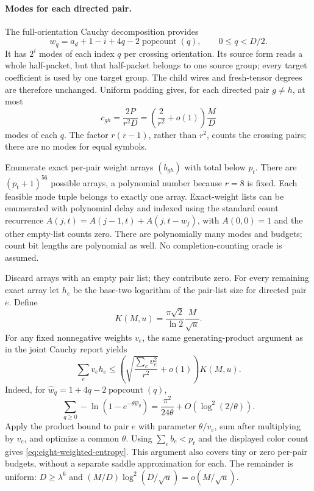 \paragraph{Modes for each directed pair.}
The full-orientation Cauchy decomposition provides
\[
 w_q=a_d+1-i+4q-2\operatorname{popcount}(q),\qquad 0\le q<D/2.
\]
It has $2^i$ modes of each index $q$ per crossing orientation.
Its source form reads a whole half-packet, but that half-packet belongs to
one source group; every target coefficient is used by one target group.
The child wires and fresh-tensor degrees are therefore unchanged.
Uniform padding gives, for each directed pair $g\ne h$, at most
\[
 c_{gh}=\frac{2P}{r^2D}
       =\left(\frac{2}{r^2}+o(1)\right)\frac{M}{D}
\]
modes of each $q$.  The factor $r(r-1)$, rather than $r^2$, counts the
crossing pairs; there are no modes for equal symbols.

Enumerate exact per-pair weight arrays $(b_{gh})$ with total below $p_t$.
There are $(p_t+1)^{56}$ possible arrays, a polynomial number because
$r=8$ is fixed.  Each feasible mode tuple belongs to exactly one array.
Exact-weight lists can be enumerated with polynomial delay and indexed
using the standard count recurrence
$A(j,t)=A(j-1,t)+A(j,t-w_j)$, with $A(0,0)=1$ and the other
empty-list counts zero.  There are polynomially many modes and budgets;
count bit lengths are polynomial as well.  No completion-counting oracle
is assumed.

Discard arrays with an empty pair list; they contribute zero.
For every remaining exact array let $h_e$ be the base-two logarithm of the pair-list
size for directed pair $e$.  Define
\[
 K(M,u)=\frac{\pi\sqrt2}{\ln2}\frac{M}{\sqrt u}.
\]
For any fixed nonnegative weights $v_e$, the same generating-product
argument as in the joint Cauchy report yields
\begin{equation}\label{eq:eight-weighted-entropy}
 \sum_e v_eh_e
 \le\left(\sqrt{\frac{\sum_ev_e^2}{r^2}}+o(1)\right)K(M,u).
\end{equation}
Indeed, for $\widehat w_q=1+4q-2\operatorname{popcount}(q)$,
\[
 \sum_{q\ge0}-\ln(1-e^{-\theta\widehat w_q})
 =\frac{\pi^2}{24\theta}+O(\log^2(2/\theta)).
\]
Apply the product bound to pair $e$ with parameter $\theta/v_e$,
sum after multiplying by $v_e$, and optimize a common $\theta$.
Using $\sum_e b_e<p_t$ and the displayed color count gives
\eqref{eq:eight-weighted-entropy}.  This argument also covers tiny or
zero per-pair budgets, without a separate saddle approximation for each.
The remainder is uniform: $D\ge\lambda^6$ and
$(M/D)\log^2(D/\sqrt u)=o(M/\sqrt u)$.

